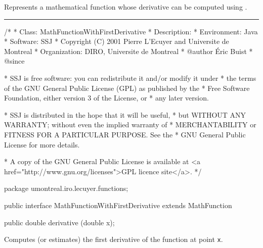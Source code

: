 
Represents a mathematical function whose
derivative can be computed using
.

\bigskip\hrule

\begin{code}
\begin{hide}
/*
 * Class:        MathFunctionWithFirstDerivative
 * Description:
 * Environment:  Java
 * Software:     SSJ
 * Copyright (C) 2001  Pierre L'Ecuyer and Universite de Montreal
 * Organization: DIRO, Universite de Montreal
 * @author       Éric Buist
 * @since

 * SSJ is free software: you can redistribute it and/or modify it under
 * the terms of the GNU General Public License (GPL) as published by the
 * Free Software Foundation, either version 3 of the License, or
 * any later version.

 * SSJ is distributed in the hope that it will be useful,
 * but WITHOUT ANY WARRANTY; without even the implied warranty of
 * MERCHANTABILITY or FITNESS FOR A PARTICULAR PURPOSE.  See the
 * GNU General Public License for more details.

 * A copy of the GNU General Public License is available at
   <a href="http://www.gnu.org/licenses">GPL licence site</a>.
 */
\end{hide}
package umontreal.iro.lecuyer.functions;\begin{hide}

\end{hide}

public interface MathFunctionWithFirstDerivative extends MathFunction\begin{hide} {
\end{hide}

   public double derivative (double x);\begin{hide}
}\end{hide}
\end{code}
\begin{tabb}
   Computes (or estimates) the first derivative
   of the function at point \texttt{x}.
\end{tabb}
\begin{htmlonly}
\end{htmlonly}
